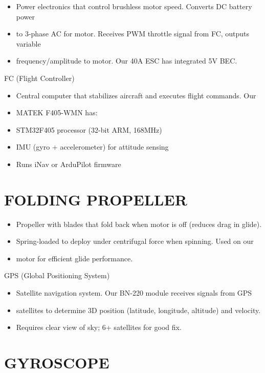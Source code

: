 \documentclass[11pt,letterpaper]{article}
\begin{document}
\begin{itemize}
  \item Power electronics that control brushless motor speed. Converts DC battery power
  \item to 3-phase AC for motor. Receives PWM throttle signal from FC, outputs variable
  \item frequency/amplitude to motor. Our 40A ESC has integrated 5V BEC.
\end{itemize}

FC (Flight Controller)\par

\begin{itemize}
  \item Central computer that stabilizes aircraft and executes flight commands. Our
  \item MATEK F405-WMN has:
  \item STM32F405 processor (32-bit ARM, 168MHz)
  \item IMU (gyro + accelerometer) for attitude sensing
  \item Runs iNav or ArduPilot firmware
\end{itemize}

\section{FOLDING PROPELLER}

\begin{itemize}
  \item Propeller with blades that fold back when motor is off (reduces drag in glide).
  \item Spring-loaded to deploy under centrifugal force when spinning. Used on our
  \item motor for efficient glide performance.
\end{itemize}

GPS (Global Positioning System)\par

\begin{itemize}
  \item Satellite navigation system. Our BN-220 module receives signals from GPS
  \item satellites to determine 3D position (latitude, longitude, altitude) and velocity.
  \item Requires clear view of sky; 6+ satellites for good fix.
\end{itemize}

\section{GYROSCOPE}
\end{document}
